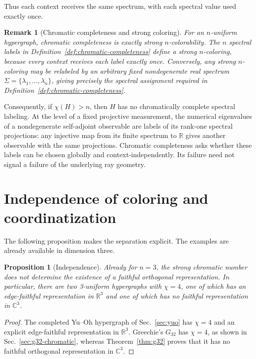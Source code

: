 \documentclass[aps,pra,twocolumn,superscriptaddress,10pt]{revtex4-2}
\newtheorem{proposition}[theorem]{Proposition}
\newtheorem{remark}[theorem]{Remark}
\newcommand{\C}{\mathbb{C}}
\newcommand{\R}{\mathbb{R}}
\begin{document}
Thus each context receives the same spectrum, with each spectral value used
exactly once.

\begin{remark}[Chromatic completeness and strong coloring]\label{rem:chromatic-completeness}
For an $n$-uniform hypergraph, chromatic completeness is exactly strong
$n$-colorability.  The $n$ spectral labels in Definition~\ref{def:chromatic-completeness}
define a strong $n$-coloring, because every context receives each label
exactly once.  Conversely, any strong $n$-coloring may be relabeled by an
arbitrary fixed nondegenerate real spectrum
$\Sigma=\{\lambda_1,\ldots,\lambda_n\}$, giving precisely the spectral
assignment required in Definition~\ref{def:chromatic-completeness}.
\end{remark}

Consequently, if $\chi(H)>n$, then $H$ has no chromatically complete spectral
labeling.  At the level of a fixed projective measurement, the numerical
eigenvalues of a nondegenerate self-adjoint observable are labels of its
rank-one spectral projections: any injective map from its finite spectrum to
$\R$ gives another observable with the same projections.  Chromatic
completeness asks whether these labels can be chosen globally and
context-independently.  Its failure need not signal a failure of the
underlying ray geometry.

\section{Independence of coloring and coordinatization}

The following proposition makes the separation explicit.  The examples are
already available in dimension three.

\begin{proposition}[Independence]\label{prop:independence}
Already for $n=3$, the strong chromatic number does not determine the
existence of a faithful orthogonal representation.  In particular, there are
two 3-uniform hypergraphs with $\chi=4$, one of which has an edge-faithful
representation in $\R^3$ and one of which has no faithful representation in
$\C^3$.
\end{proposition}

\begin{proof}
The completed Yu--Oh hypergraph of Sec.~\ref{sec:yuo} has $\chi=4$ and an
explicit edge-faithful representation in $\R^3$.  Greechie's $G_{32}$ has
$\chi=4$, as shown in Sec.~\ref{sec:g32-chromatic}, whereas
Theorem~\ref{thm:g32} proves that it has no faithful orthogonal representation
in $\C^3$.
\end{proof}
\end{document}

